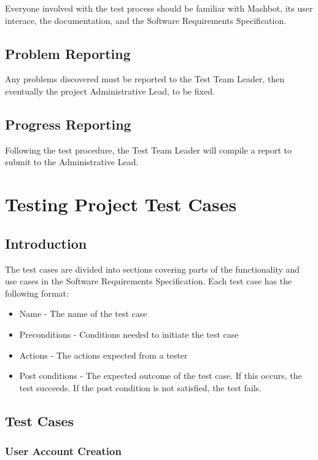 \documentclass{article}
\begin{document}
Everyone involved with the test process should be familiar with Mashbot, its
user interace, the documentation, and the Software Requirements Specification.

\subsection{Problem Reporting}

Any problems discovered must be reported to the Test Team Leader, then
eventually the project Administrative Lead, to be fixed.

\subsection{Progress Reporting}

Following the test procedure, the Test Team Leader will compile a report to
submit to the Administrative Lead.

\section{Testing Project Test Cases}

\subsection{Introduction} %
	The test cases are divided into sections covering parts of the functionality and use cases in the Software Requirements Specification. Each test case has the following format:
	\begin{itemize}
	  \item Name - The name of the test case
	  \item Preconditions - Conditions needed to initiate the test case
	  \item Actions - The actions expected from a tester
	  \item Post conditions - The expected outcome of the test
            case. If this occurs, the test succeeds. If the post
            condition is not satisfied, the test fails.
	\end{itemize}

\subsection{Test Cases}
\subsubsection{User Account Creation} %
\end{document}
